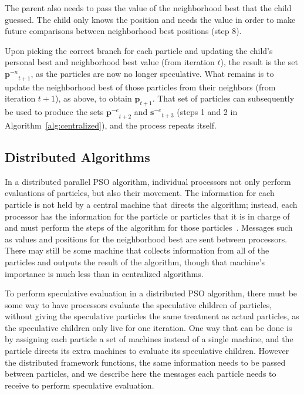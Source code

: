 \documentclass[journal,letterpaper]{IEEEtran}
\newcommand{\alg}[1]{Algorithm~\ref{alg:#1}}
\providecommand{\noeval}[1]{\ensuremath{#1^{-e}}}
\providecommand{\nonbest}[1]{\ensuremath{#1^{-n}}}
\providecommand{\pset}{\ensuremath{\mathbf{p}}}
\providecommand{\sset}{\ensuremath{\mathbf{s}}}
\begin{document}
The parent also needs to pass the value of the neighborhood best that the child
guessed.  The child only knows the position and needs the value in order to
make future comparisons between neighborhood best positions (step 8).

Upon picking the correct branch for each particle and updating the child's
personal best and neighborhood best value (from iteration $t$), the result is
the set $\nonbest{\pset}_{t+1}$, as the particles are now no longer
speculative.  What remains is to update the neighborhood best of those
particles from their neighbors (from iteration $t+1$), as above, to obtain
$\pset_{t+1}$.  That set of particles can subsequently be used to produce the
sets $\noeval{\pset}_{t+2}$ and $\noeval{\sset}_{t+3}$ (steps 1 and 2 in
\alg{centralized}), and the process repeats itself.

\subsection{Distributed Algorithms}

\label{sec:distributed}

In a distributed parallel PSO algorithm, individual processors not only perform
evaluations of particles, but also their movement.  The information for each
particle is not held by a central machine that directs the algorithm; instead,
each processor has the information for the particle or particles that it is in
charge of and must perform the steps of the algorithm for those
particles~\cite{mcnabb-2007-parallel-pso-using-mapreduce}.  Messages such as
values and positions for the neighborhood best are sent between processors.
There may still be some machine that collects information from all of the
particles and outputs the result of the algorithm, though that machine's
importance is much less than in centralized algorithms.

To perform speculative evaluation in a distributed PSO algorithm, there must be
some way to have processors evaluate the speculative children of particles,
without giving the speculative particles the same treatment as actual
particles, as the speculative children only live for one iteration.  One way
that can be done is by assigning each particle a set of machines instead of a
single machine, and the particle directs its extra machines to evaluate its
speculative children.  However the distributed framework functions, the same
information needs to be passed between particles, and we describe here the
messages each particle needs to receive to perform speculative evaluation.
\end{document}

